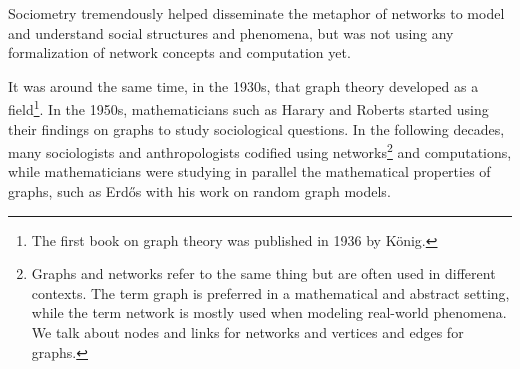 Sociometry tremendously helped disseminate the metaphor of networks to model and understand social structures and phenomena, but was not using any formalization of network concepts and computation yet.

It was around the same time, in the 1930s, that graph theory developed as a field\footnote{The first book on graph theory was published in 1936 by König\cite{konigTheoryFiniteInfinite1990}.}. In the 1950s, mathematicians such as Harary and Roberts started using their findings on graphs to study sociological questions\cite{harary1953graph}. 
In the following decades, many sociologists and anthropologists codified \sna using networks\footnote{Graphs and networks refer to the same thing but are often used in different contexts. The term graph is preferred in a mathematical and abstract setting, while the term network is mostly used when modeling real-world phenomena. We talk about nodes and links for networks and vertices and edges for graphs.} and computations\cite{cConceptUseSocial1969, freemanDevelopmentSocialNetwork2004}, while mathematicians were studying in parallel the mathematical properties of graphs, such as Erd\H{o}s with his work on random graph models\cite{erdos2011}.

